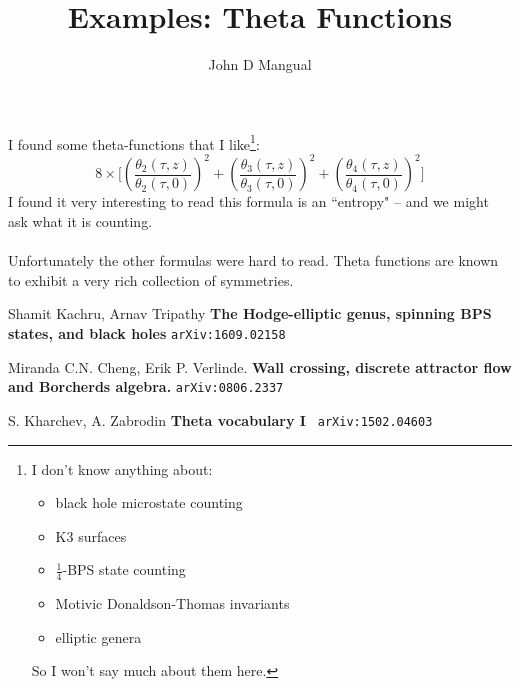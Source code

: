 \documentclass[12pt]{article}
\title{\textbf{ Examples:  Theta Functions }}
\author{John D Mangual}
\date{}
\begin{document}
\selectfont \fontsize{25}{30}\selectfont

\maketitle

\noindent I found some theta-functions that I like\footnote{I don't know anything about:
\begin{itemize}
\item black hole microstate counting
\item K3 surfaces
\item $\frac{1}{4}$-BPS state counting
\item Motivic Donaldson-Thomas invariants
\item elliptic genera
\end{itemize}
So I won't say much about them here.}:
$$ 8 \times \Bigg[ \left(\frac{\theta_2(\tau, z)}{\theta_2(\tau, 0)} \right)^2 +
\left(\frac{\theta_3(\tau, z)}{\theta_3(\tau, 0)} \right)^2 +
\left(\frac{\theta_4(\tau, z)}{\theta_4(\tau, 0)} \right)^2 \Bigg]
$$
I found it very interesting to read this formula is an ``entropy" -- and we might ask what it is counting. \\ \\
Unfortunately the other formulas were hard to read.  Theta functions are known to exhibit a very rich collection of symmetries.  

\newpage

\selectfont \fontsize{12}{10}\selectfont

\begin{thebibliography}{}



\item Shamit Kachru, Arnav Tripathy \textbf{The Hodge-elliptic genus, spinning BPS states, and black holes} \texttt{arXiv:1609.02158}
\item Miranda C.N. Cheng, Erik P. Verlinde. \textbf{Wall crossing, discrete attractor flow and Borcherds algebra.} \texttt{arXiv:0806.2337}
\item S. Kharchev, A. Zabrodin \textbf{Theta vocabulary I} \texttt{ arXiv:1502.04603}

\end{thebibliography}
\end{document}
